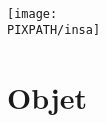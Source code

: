 
\maketitle

\thispagestyle{empty}

\hfill\\
\vfill


\begin{center}
    \texttt{[image: \\PIXPATH/insa]}\hfill\\
\end{center}

\section*{Objet}
\Object
